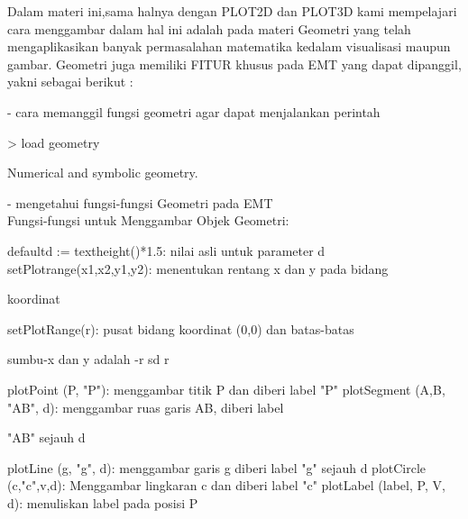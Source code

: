 \documentclass[a4paper,10pt]{article}
\begin{document}
\begin{eulernotebook}
\begin{eulercomment}
\begin{eulercomment}
\begin{eulercomment}
\end{eulercomment}
\eulersubheading{}
\eulersubheading{}
\begin{eulercomment}
Dalam materi ini,sama halnya dengan PLOT2D dan PLOT3D kami mempelajari cara menggambar dalam
hal ini adalah pada materi Geometri yang telah mengaplikasikan banyak permasalahan matematika
kedalam visualisasi maupun gambar. Geometri juga memiliki FITUR khusus pada EMT yang dapat
dipanggil, yakni sebagai berikut :

- cara memanggil fungsi geometri agar dapat menjalankan perintah
\end{eulercomment}
\begin{eulerprompt}
> load geometry
\end{eulerprompt}
\begin{euleroutput}
  Numerical and symbolic geometry.
\end{euleroutput}
\begin{eulercomment}
- mengetahui fungsi-fungsi Geometri pada EMT\\
Fungsi-fungsi untuk Menggambar Objek Geometri:

\end{eulercomment}
\begin{eulerttcomment}
  defaultd := textheight()*1.5: nilai asli untuk parameter d
  setPlotrange(x1,x2,y1,y2): menentukan rentang x dan y pada bidang
\end{eulerttcomment}
\begin{eulercomment}
koordinat\\
\end{eulercomment}
\begin{eulerttcomment}
  setPlotRange(r): pusat bidang koordinat (0,0) dan batas-batas
\end{eulerttcomment}
\begin{eulercomment}
sumbu-x dan y adalah -r sd r\\
\end{eulercomment}
\begin{eulerttcomment}
  plotPoint (P, "P"): menggambar titik P dan diberi label "P"
  plotSegment (A,B, "AB", d): menggambar ruas garis AB, diberi label
\end{eulerttcomment}
\begin{eulercomment}
"AB" sejauh d\\
\end{eulercomment}
\begin{eulerttcomment}
  plotLine (g, "g", d): menggambar garis g diberi label "g" sejauh d
  plotCircle (c,"c",v,d): Menggambar lingkaran c dan diberi label "c"
  plotLabel (label, P, V, d): menuliskan label pada posisi P
\end{eulerttcomment}
\begin{eulercomment}


\end{eulercomment}
\end{eulercomment}
\end{eulercomment}
\end{eulernotebook}
\end{document}
